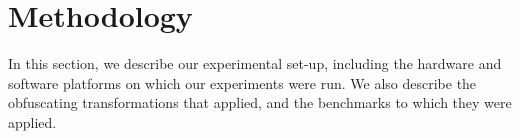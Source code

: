 
\section{Methodology}
\label{sec:methodology}
In this section, we describe our experimental set-up, including the hardware and software platforms on which our experiments were run. We also describe the obfuscating transformations that applied, and the benchmarks to which they were applied.








